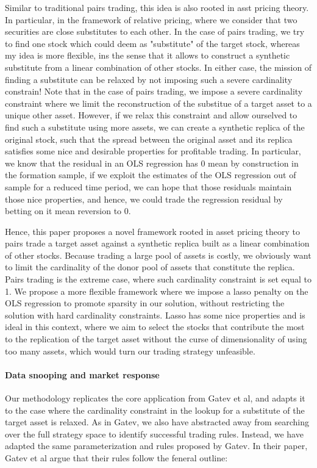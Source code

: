 Similar to traditional pairs trading, this idea is also rooted in asst pricing theory. In particular, in the framework of relative pricing, where we consider that two securities are close substitutes to each other. In the case of pairs trading, we try to find one stock which could deem as "substitute" of the target stock, whereas my idea is more flexible, ins the sense that it allows to construct a synthetic substitute from a linear combination of other stocks. In either case, the mission of finding a substitute can be relaxed by not imposing such a severe cardinality constrain! Note that in the case of pairs trading, we impose a severe cardinality constraint where we limit the reconstruction of the substitue of a target asset to a unique other asset. However, if we relax this constraint and allow ourselved to find such a substitute using more assets, we can create a synthetic replica of the original stock, such that the spread between the original asset and its replica satisfies some nice and desirable properties for profitable trading. In particular, we know that the residual in an OLS regression has 0 mean by construction in the formation sample, if we exploit the estimates of the OLS regression out of sample for a reduced time period, we can hope that those residuals maintain those nice properties, and hence, we could trade the regression residual by betting on it mean reversion to 0.


Hence, this paper proposes a novel framework rooted in asset pricing theory to pairs trade a target asset against a synthetic replica built as a linear combination of other stocks. Because trading a large pool of assets is costly, we obviously want to limit the cardinality of the donor pool of assets that constitute the replica. Pairs trading is the extreme case, where such cardinality constraint is set equal to 1. We propose a more flexible framework where we impose a lasso penalty on the OLS regression to promote sparsity in our solution, without restricting the solution with hard cardinality constraints. Lasso has some nice properties and is ideal in this context, where we aim to select the stocks that contribute the most to the replication of the target asset without the curse of dimensionality of using too many assets, which would turn our trading strategy unfeasible. 


\paragraph{Data snooping and market response}
Our methodology replicates the core application from Gatev et al, and adapts it to the case where the cardinality constraint in the lookup for a substitute of the target asset is relaxed.
As in Gatev, we also have abstracted away from searching over the full strategy space to identify successful trading rules. Instead, we have adapted the same parameterization and rules proposed by Gatev. In their paper, Gatev et al argue that their rules follow the feneral outline:

